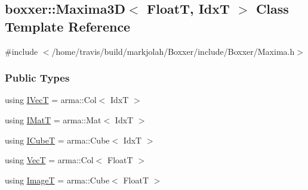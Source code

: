 \hypertarget{classboxxer_1_1Maxima3D}{}\subsection{boxxer\+:\+:Maxima3D$<$ FloatT, IdxT $>$ Class Template Reference}
\label{classboxxer_1_1Maxima3D}


{\ttfamily \#include $<$/home/travis/build/markjolah/\+Boxxer/include/\+Boxxer/\+Maxima.\+h$>$}

\subsubsection*{Public Types}
\begin{DoxyCompactItemize}
\item 
using \hyperlink{classboxxer_1_1Maxima3D_a5fee3acd26edc152ba90e90812e40c1f}{I\+VecT} = arma\+::\+Col$<$ IdxT $>$
\item 
using \hyperlink{classboxxer_1_1Maxima3D_a51dcfe38a24fa1264aabbc4369d795bb}{I\+MatT} = arma\+::\+Mat$<$ IdxT $>$
\item 
using \hyperlink{classboxxer_1_1Maxima3D_af84c08251794d634d33f2b388d465724}{I\+CubeT} = arma\+::\+Cube$<$ IdxT $>$
\item 
using \hyperlink{classboxxer_1_1Maxima3D_a3b589b4792d6446b7418a565314b126b}{VecT} = arma\+::\+Col$<$ FloatT $>$
\item 
using \hyperlink{classboxxer_1_1Maxima3D_aebf2125d25bccd44361a369831600569}{ImageT} = arma\+::\+Cube$<$ FloatT $>$
\end{DoxyCompactItemize}
